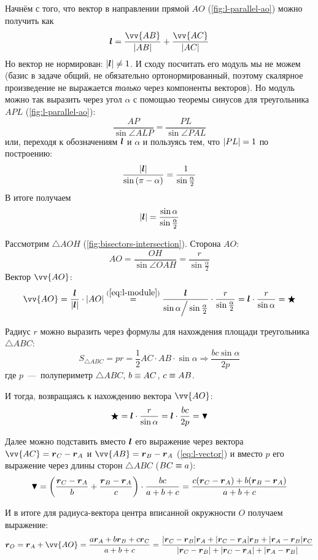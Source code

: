 \documentclass[a4paper,12pt]{article}
\begin{document}
\begin{solution}
    Начнём с того, что вектор в направлении прямой $AO$ (\ref{fig:l-parallel-ao}) можно получить как
    \begin{equation}\label{eq:l-vector}
      \bds l = \frac{\vv{AB}}{|AB|} + \frac{\vv{AC}}{|AC|}
    \end{equation}
    Но вектор не нормирован: $|\bds l| \hm{\not=} 1$.
    И сходу посчитать его модуль мы не можем (базис в задаче общий, не обязательно ортонормированный, поэтому скалярное произведение не выражается \emph{только} через компоненты векторов).
    Но модуль можно так выразить через угол $\alpha$ с помощью теоремы синусов для треугольника $APL$ (\ref{fig:l-parallel-ao}):
    \[
      \frac{AP}{\sin{\angle ALP}} = \frac{PL}{\sin{\angle PAL}}
    \]
    или, переходя к обозначениям $\boldsymbol l$ и $\alpha$ и пользуясь тем, что $|PL| \hm= 1$ по построению:
    \[
      \frac{|\boldsymbol l|}{\sin{(\pi - \alpha)}} = \frac{1}{\sin \frac{\alpha}{2}}
    \]
    В итоге получаем
    \begin{equation}\label{eq:l-module}
      |\boldsymbol l| = \frac{\sin \alpha}{\sin \frac{\alpha}{2}}
    \end{equation}
    
    Рассмотрим $\triangle AOH$ (\ref{fig:bisectors-intersection}).
    Сторона $AO$:
    \[
      AO = \frac{OH}{\sin \angle OAH} = \frac{r}{\sin \frac{\alpha}{2}}
    \]
    Вектор $\vv{AO}$:
    \[
      \vv{AO} = \frac{\bds l}{|\bds l|} \cdot |AO|
        \stackrel{(\ref{eq:l-module})}{=} \frac{\bds l}{\sin \alpha \Big/ \sin \frac{\alpha}{2}} \cdot \frac{r}{\sin \frac{\alpha}{2}}
        = \bds l \cdot \frac{r}{\sin \alpha}
        = \bigstar
    \]
    
    Радиус $r$ можно выразить через формулы для нахождения площади треугольника $\triangle ABC$:
    \[
      S_{\triangle ABC} = pr = \frac{1}{2} AC \cdot AB \cdot \sin \alpha
        \Rightarrow \frac{bc \sin \alpha}{2p}
    \]
    где $p$~---~полупериметр $\triangle ABC$, $b \hm\equiv AC$, $c \hm\equiv AB$.
    
    И тогда, возвращаясь к нахождению вектора $\vv{AO}$:
    \[
      \bigstar = \boldsymbol l \cdot \frac{r}{\sin \alpha}
        = \boldsymbol l \cdot \frac{bc}{2p}
        = \blacktriangledown
    \]
    
    Далее можно подставить вместо $\boldsymbol l$ его выражение через вектора $\vv{AC} \hm= \bds r_C \hm- \bds r_A$ и $\vv{AB} \hm= \bds r_B \hm- \bds r_A$ (\ref{eq:l-vector}) и вместо $p$ его выражение через длины сторон $\triangle ABC$ ($BC \hm\equiv a$):
    \[
      \blacktriangledown = \left(\frac{\boldsymbol r_C - \boldsymbol r_A}{b} + \frac{\boldsymbol r_B - \boldsymbol r_A}{c}\right) \cdot \frac{bc}{a + b + c}
        = \frac{c(\boldsymbol r_C - \boldsymbol r_A) + b(\boldsymbol r_B - \boldsymbol r_A)}{a + b + c}
    \]
    
    И в итоге для радиуса-вектора центра вписанной окружности $O$ получаем выражение:
    \[
      \bds r_O = \bds r_A + \vv{AO}
        = \frac{a \bds r_A + b \bds r_B + c \bds r_C}{a + b + c}
        = \frac{|\bds r_C - \bds r_B| \bds r_A + |\bds r_C - \bds r_A| \bds r_B + |\bds r_A - \bds r_B| \bds r_C}{|\bds r_C - \bds r_B| + |\bds r_C - \bds r_A| + |\bds r_A - \bds r_B|}
    \]
  \end{solution}
\end{document}

